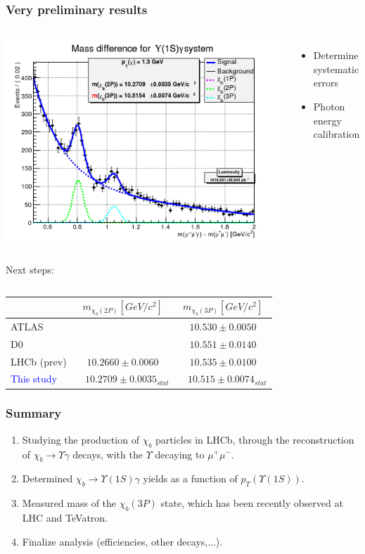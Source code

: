 \documentclass{beamer}
\begin{document}
\begin{frame}[t]
\frametitle{Very preliminary results}
\begin{columns}[T]
\includegraphics[height=.4\textheight]{images/m3p.png}\\~\\
Next steps:

\begin{itemize}
  \item Determine systematic errors
  \item Photon energy calibration
\end{itemize}
\end{columns}
\begin{tabular}{|l|c|c|}\hline
              &  $m_{\chi_b(2P)} [GeV/c^2]$ & $m_{\chi_b(3P)} [GeV/c^2]$\\ \hline
ATLAS         &                             & $10.530 \pm 0.0050$\\
D0            &                             & $10.551 \pm 0.0140$\\
LHCb (prev)   &  $10.2660 \pm 0.0060$       & $10.535 \pm 0.0100$\\ \hline
\textcolor{blue}{This study} & $~~~~10.2709 \pm 0.0035_{stat}$ & $~~~~10.515 \pm 0.0074_{stat}$ \\ \hline
\end{tabular}
\end{frame}

\begin{frame}
\frametitle{Summary}
\begin{enumerate}
\item Studying the production of $\chi_b$ particles in LHCb, through the reconstruction of $\chi_b \rightarrow \Upsilon \gamma$ decays, with the $\Upsilon$ decaying to $\mu^+ \mu^-$.
\item Determined $\chi_b \rightarrow \Upsilon(1S) \gamma$ yields as a function of $p_{T}(\Upsilon(1S))$.
\item Measured  mass of the $\chi_b(3P)$ state, which has been recently observed at LHC and TeVatron.
\item Finalize analysis (efficiencies, other decays,...).
\end{enumerate}
\end{frame}
\end{document}
